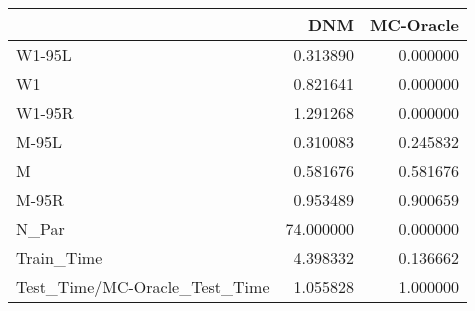 \begin{tabular}{lrr}
\toprule
{} &        DNM &  MC-Oracle \\
\midrule
W1-95L                        &   0.313890 &   0.000000 \\
W1                            &   0.821641 &   0.000000 \\
W1-95R                        &   1.291268 &   0.000000 \\
M-95L                         &   0.310083 &   0.245832 \\
M                             &   0.581676 &   0.581676 \\
M-95R                         &   0.953489 &   0.900659 \\
N\_Par                         &  74.000000 &   0.000000 \\
Train\_Time                    &   4.398332 &   0.136662 \\
Test\_Time/MC-Oracle\_Test\_Time &   1.055828 &   1.000000 \\
\bottomrule
\end{tabular}
